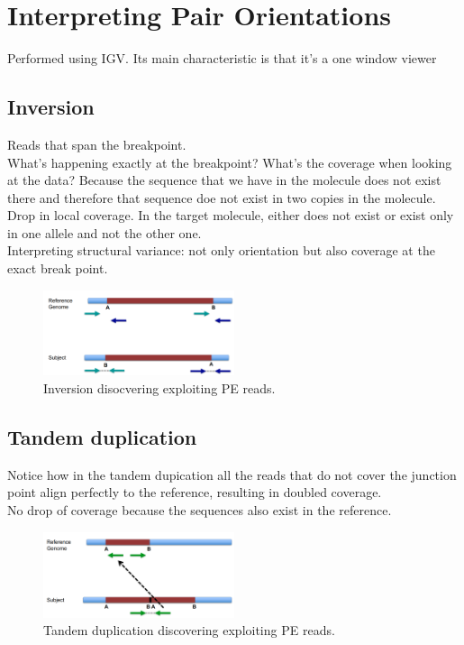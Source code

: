 \section{Interpreting Pair Orientations}
Performed using IGV. Its main characteristic is that it's a one window viewer 
\subsection{Inversion}
Reads that span the breakpoint. \\
What's happening exactly at the breakpoint? What's the coverage when looking at the data? Because the sequence that we have in the molecule does not exist there and therefore that sequence doe not exist in two copies in the molecule. 
Drop in local coverage.  
In the target molecule, either does not exist or exist only in one allele and not the other one. \\
Interpreting structural variance: not only orientation but also coverage at the exact break point. 


\begin{figure}[htbp!]
    \centering
    \includegraphics[width=0.5\textwidth]{inversion.png}
    \caption{Inversion disocvering exploiting PE reads.}
    \label{fig:inversion}
\end{figure}


\subsection{Tandem duplication}
Notice how in the tandem dupication all the reads that do not cover the junction point align perfectly to the reference, resulting in doubled coverage.\\
No drop of coverage because the sequences also exist in the reference. \\

\begin{figure}[htbp!]
    \centering
    \includegraphics[width=0.5\textwidth]{tandem.png}
    \caption{Tandem duplication discovering exploiting PE reads.}
    \label{fig:inversion}
\end{figure}

